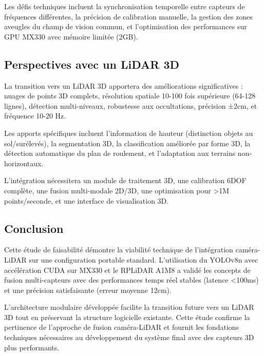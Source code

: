 Les défis techniques incluent la synchronisation temporelle entre capteurs de fréquences différentes, la précision de calibration manuelle, la gestion des zones aveugles du champ de vision commun, et l'optimisation des performances sur GPU MX330 avec mémoire limitée (2GB).

\subsection{Perspectives avec un LiDAR 3D}
\label{sec:perspectives_lidar_3d}

La transition vers un LiDAR 3D apportera des améliorations significatives : nuages de points 3D complets, résolution spatiale 10-100 fois supérieure (64-128 lignes), détection multi-niveaux, robustesse aux occultations, précision ±2cm, et fréquence 10-20 Hz.

Les apports spécifiques incluent l'information de hauteur (distinction objets au sol/surélevés), la segmentation 3D, la classification améliorée par forme 3D, la détection automatique du plan de roulement, et l'adaptation aux terrains non-horizontaux.

L'intégration nécessitera un module de traitement 3D, une calibration 6DOF complète, une fusion multi-modale 2D/3D, une optimisation pour >1M points/seconde, et une interface de visualisation 3D.

\subsection{Conclusion}
\label{sec:conclusion_faisabilite}

Cette étude de faisabilité démontre la viabilité technique de l'intégration caméra-LiDAR sur une configuration portable standard. L'utilisation du YOLOv8n avec accélération CUDA sur MX330 et le RPLiDAR A1M8 a validé les concepts de fusion multi-capteurs avec des performances temps réel stables (latence <100ms) et une précision satisfaisante (erreur moyenne 12cm).

L'architecture modulaire développée facilite la transition future vers un LiDAR 3D tout en préservant la structure logicielle existante. Cette étude confirme la pertinence de l'approche de fusion caméra-LiDAR et fournit les fondations techniques nécessaires au développement du système final avec des capteurs 3D plus performants.
